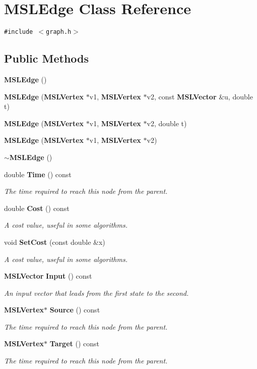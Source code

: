 \section{MSLEdge  Class Reference}
\label{classMSLEdge}
{\tt \#include $<$graph.h$>$}

\subsection*{Public Methods}
\begin{CompactItemize}
\item 
{\bf MSLEdge} ()
\item 
{\bf MSLEdge} ({\bf MSLVertex} $\ast$v1, {\bf MSLVertex} $\ast$v2, const {\bf MSLVector} \&u, double t)
\item 
{\bf MSLEdge} ({\bf MSLVertex} $\ast$v1, {\bf MSLVertex} $\ast$v2, double t)
\item 
{\bf MSLEdge} ({\bf MSLVertex} $\ast$v1, {\bf MSLVertex} $\ast$v2)
\item 
{\bf $\sim$MSLEdge} ()
\item 
double {\bf Time} () const
\begin{CompactList}\small\item\em The time required to reach this node from the parent.\item\end{CompactList}\item 
double {\bf Cost} () const
\begin{CompactList}\small\item\em A cost value, useful in some algorithms.\item\end{CompactList}\item 
void {\bf Set\-Cost} (const double \&x)
\begin{CompactList}\small\item\em A cost value, useful in some algorithms.\item\end{CompactList}\item 
{\bf MSLVector} {\bf Input} () const
\begin{CompactList}\small\item\em An input vector that leads from the first state to the second.\item\end{CompactList}\item 
{\bf MSLVertex}$\ast$ {\bf Source} () const
\begin{CompactList}\small\item\em The time required to reach this node from the parent.\item\end{CompactList}\item 
{\bf MSLVertex}$\ast$ {\bf Target} () const
\begin{CompactList}\small\item\em The time required to reach this node from the parent.\item\end{CompactList}\end{CompactItemize}
